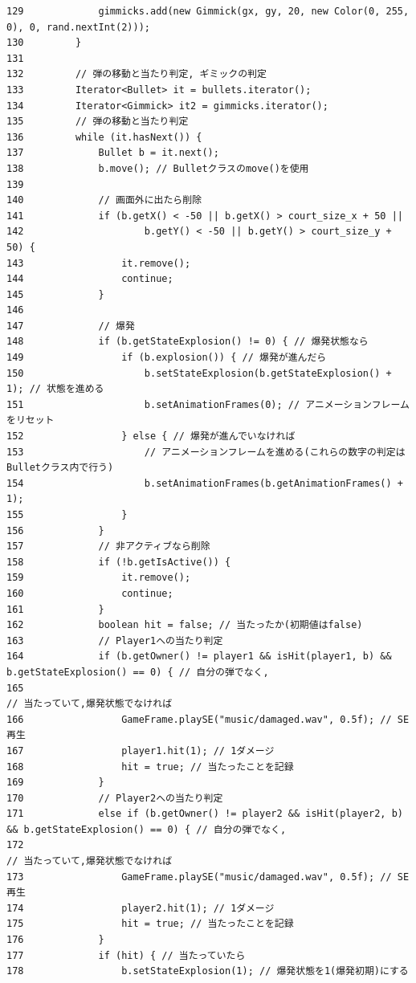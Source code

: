 \documentclass[11pt,a4j]{jarticle}
\begin{document}
\begin{small}
\begin{verbatim}
129             gimmicks.add(new Gimmick(gx, gy, 20, new Color(0, 255, 0), 0, rand.nextInt(2)));
130         }
131 
132         // 弾の移動と当たり判定, ギミックの判定
133         Iterator<Bullet> it = bullets.iterator();
134         Iterator<Gimmick> it2 = gimmicks.iterator();
135         // 弾の移動と当たり判定
136         while (it.hasNext()) {
137             Bullet b = it.next();
138             b.move(); // Bulletクラスのmove()を使用
139 
140             // 画面外に出たら削除
141             if (b.getX() < -50 || b.getX() > court_size_x + 50 ||
142                     b.getY() < -50 || b.getY() > court_size_y + 50) {
143                 it.remove();
144                 continue;
145             }
146 
147             // 爆発
148             if (b.getStateExplosion() != 0) { // 爆発状態なら
149                 if (b.explosion()) { // 爆発が進んだら
150                     b.setStateExplosion(b.getStateExplosion() + 1); // 状態を進める
151                     b.setAnimationFrames(0); // アニメーションフレームをリセット
152                 } else { // 爆発が進んでいなければ
153                     // アニメーションフレームを進める(これらの数字の判定はBulletクラス内で行う)
154                     b.setAnimationFrames(b.getAnimationFrames() + 1);
155                 }
156             }
157             // 非アクティブなら削除
158             if (!b.getIsActive()) {
159                 it.remove();
160                 continue;
161             }
162             boolean hit = false; // 当たったか(初期値はfalse)
163             // Player1への当たり判定
164             if (b.getOwner() != player1 && isHit(player1, b) && b.getStateExplosion() == 0) { // 自分の弾でなく,
165                                                                                               // 当たっていて,爆発状態でなければ
166                 GameFrame.playSE("music/damaged.wav", 0.5f); // SE再生
167                 player1.hit(1); // 1ダメージ
168                 hit = true; // 当たったことを記録
169             }
170             // Player2への当たり判定
171             else if (b.getOwner() != player2 && isHit(player2, b) && b.getStateExplosion() == 0) { // 自分の弾でなく,
172                                                                                                    // 当たっていて,爆発状態でなければ
173                 GameFrame.playSE("music/damaged.wav", 0.5f); // SE再生
174                 player2.hit(1); // 1ダメージ
175                 hit = true; // 当たったことを記録
176             }
177             if (hit) { // 当たっていたら
178                 b.setStateExplosion(1); // 爆発状態を1(爆発初期)にする

\end{verbatim}
\end{small}
\end{document}
